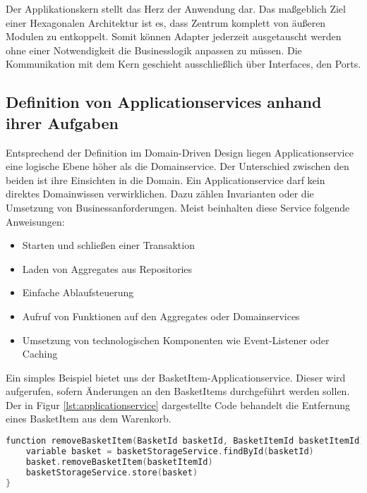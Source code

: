 Der Applikationskern stellt das Herz der Anwendung dar. Das maßgeblich Ziel einer Hexagonalen Architektur ist es, dass Zentrum komplett von äußeren Modulen zu entkoppelt. Somit können Adapter jederzeit ausgetauscht werden ohne einer Notwendigkeit die Businesslogik anpassen zu müssen. Die Kommunikation mit dem Kern geschieht ausschließlich über Interfaces, den Ports.

\subsection{Definition von Applicationservices anhand ihrer Aufgaben}

Entsprechend der Definition im Domain-Driven Design liegen Applicationservice eine logische Ebene höher als die Domainservice. Der Unterschied zwischen den beiden ist ihre Einsichten in die Domain. Ein Applicationservice darf kein direktes Domainwissen verwirklichen. Dazu zählen Invarianten oder die Umsetzung von Businessanforderungen.
Meist beinhalten diese Service folgende Anweisungen:

\begin{itemize}[noitemsep,nolistsep]
	\item Starten und schließen einer Transaktion
	\item Laden von Aggregates aus Repositories
	\item Einfache Ablaufsteuerung
	\item Aufruf von Funktionen auf den Aggregates oder Domainservices
	\item Umsetzung von technologischen Komponenten wie Event-Listener oder Caching
\end{itemize}

Ein simples Beispiel bietet uns der BasketItem-Applicationservice. Dieser wird aufgerufen, sofern Änderungen an den BasketItems durchgeführt werden sollen. Der in Figur \ref{lst:applicationservice} dargestellte Code behandelt die Entfernung eines BasketItem aus dem Warenkorb.

\begin{minipage}{\linewidth} %
	\begin{lstlisting}[caption={Eine Beispielsfunktion des BasketItem-Applikationservice}, label={lst:applicationservice}, language=Kotlin]
function removeBasketItem(BasketId basketId, BasketItemId basketItemId) {
	variable basket = basketStorageService.findById(basketId)
	basket.removeBasketItem(basketItemId)
	basketStorageService.store(basket)
}
	\end{lstlisting}
\end{minipage}

